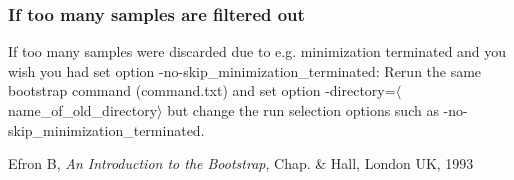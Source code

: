 \subsubsection*{If too many samples are filtered out}
If too many samples were discarded due to e.g. minimization terminated and you wish you had set  option -no-skip\_minimization\_terminated: 
Rerun the same bootstrap command (command.txt) and set option -directory=$\langle$name\_of\_old\_directory$\rangle$ but change the
run selection options such as -no-skip\_minimization\_terminated. 

\begin{thebibliography}{1}
 Efron B, {\em An Introduction to the Bootstrap}, Chap. \& Hall, London UK, 1993
\end{thebibliography}



